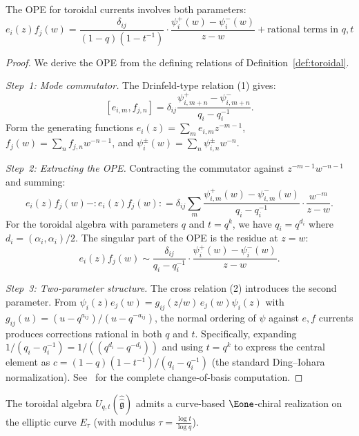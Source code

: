 \begin{proposition}\label{prop:toroidal-ope}
The OPE for toroidal currents involves both parameters:
\[
e_i(z) f_j(w) = \frac{\delta_{ij}}{(1 - q)(1 - t^{-1})} \cdot
\frac{\psi_i^+(w) - \psi_i^-(w)}{z - w} + \text{rational terms in } q, t
\]
\end{proposition}

\begin{proof}
We derive the OPE from the defining relations of Definition~\ref{def:toroidal}.

\emph{Step~1: Mode commutator.}
The Drinfeld-type relation (1) gives:
\[
[e_{i,m}, f_{j,n}] = \delta_{ij} \frac{\psi^+_{i,m+n} - \psi^-_{i,m+n}}{q_i - q_i^{-1}}.
\]
Form the generating functions $e_i(z) = \sum_m e_{i,m} z^{-m-1}$,
$f_j(w) = \sum_n f_{j,n} w^{-n-1}$, and
$\psi_i^\pm(w) = \sum_n \psi^\pm_{i,n} w^{-n}$.

\emph{Step~2: Extracting the OPE.}
Contracting the commutator against $z^{-m-1} w^{-n-1}$ and summing:
\[
e_i(z) f_j(w) - {:}e_i(z) f_j(w){:}
= \delta_{ij} \sum_{m} \frac{\psi^+_{i,m}(w) - \psi^-_{i,m}(w)}{q_i - q_i^{-1}} \cdot \frac{w^{-m}}{z - w}.
\]
For the toroidal algebra with parameters $q$ and $t = q^k$,
we have $q_i = q^{d_i}$ where $d_i = (\alpha_i, \alpha_i)/2$.
The singular part of the OPE is the residue at $z = w$:
\[
e_i(z) f_j(w) \sim \frac{\delta_{ij}}{q_i - q_i^{-1}} \cdot
\frac{\psi_i^+(w) - \psi_i^-(w)}{z - w}.
\]

\emph{Step~3: Two-parameter structure.}
The cross relation (2) introduces the second parameter.
From $\psi_i(z) e_j(w) = g_{ij}(z/w) \, e_j(w) \psi_i(z)$
with $g_{ij}(u) = (u - q^{a_{ij}})/(u - q^{-a_{ij}})$,
the normal ordering of $\psi$ against $e, f$ currents produces
corrections rational in both $q$ and $t$. Specifically, expanding
$1/(q_i - q_i^{-1}) = 1/((q^{d_i} - q^{-d_i}))$ and using
$t = q^k$ to express the central element as
$c = (1 - q)(1-t^{-1})/(q_i - q_i^{-1})$ (the standard Ding--Iohara
normalization). See~\cite{DI97} for the complete change-of-basis computation.
\end{proof}

\begin{conjecture}\label{conj:toroidal-e1}
The toroidal algebra $U_{q,t}(\hat{\hat{\mathfrak{g}}})$ admits a
curve-based $\Eone$-chiral realization on the elliptic curve
$E_\tau$ (with modulus $\tau = \frac{\log t}{\log q}$).
\end{conjecture}

